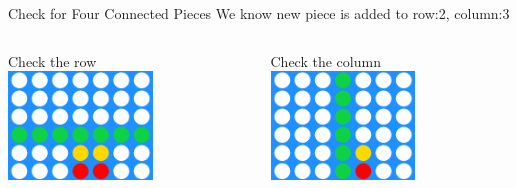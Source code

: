         \begin{frame}{Check for Four Connected Pieces}
            \LARGE
            We know new piece is added to row:2, column:3\\
            \begin{columns}
                \begin{column}{0.5\textwidth}
                    Check the row\\
                    \centering
                    \includegraphics[width=0.6\textwidth]{images/connect_four_board_3.png}
                \end{column}
                \pause
                \begin{column}{0.5\textwidth}
                    Check the column\\
                    \centering
                    \includegraphics[width=0.6\textwidth]{images/connect_four_board_1.png}\\
                \end{column}
            \end{columns}
        \end{frame}

